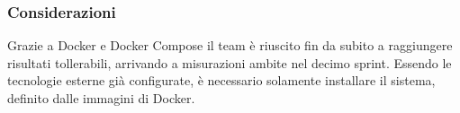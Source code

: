 \documentclass[10pt, a4paper]{article}
\begin{document}
\subsubsection{Considerazioni}
Grazie a Docker e Docker Compose il team è riuscito fin da subito a raggiungere risultati tollerabili, arrivando a misurazioni ambite nel decimo sprint. Essendo le tecnologie esterne già configurate, è necessario solamente installare il sistema, definito dalle immagini di Docker. 
\end{document}
